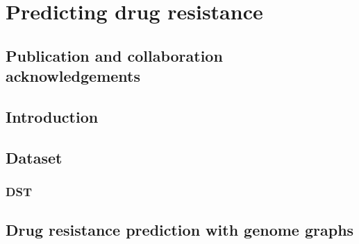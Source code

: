 \chapter{Predicting \mtb{} drug resistance}
\label{chap:dst}
\ifpdf
    \graphicspath{{Chapter3/Figs/Raster/}{Chapter3/Figs/PDF/}{Chapter3/Figs/}}
\else
    \graphicspath{{Chapter3/Figs/Vector/}{Chapter3/Figs/}}
\fi


\setcounter{section}{-1}
\section{Publication and collaboration acknowledgements}
\label{sec:ch3-acknowledge}

\section{Introduction}

\section{Dataset}

\subsection{DST}


\section{Drug resistance prediction with genome graphs}

